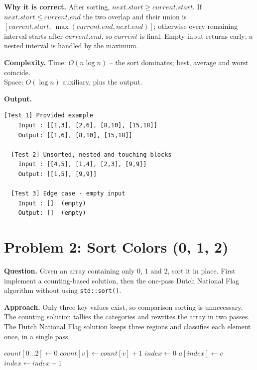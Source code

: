 \documentclass[11pt]{article}
\begin{document}
\textbf{Why it is correct.} After sorting, $next.start \ge current.start$. If $next.start \le current.end$ the two overlap and their union is $[current.start,\ \max(current.end, next.end)]$; otherwise every remaining interval starts after $current.end$, so $current$ is final. Empty input returns early; a nested interval is handled by the maximum.

\textbf{Complexity.} Time: $O(n\log n)$ -- the sort dominates; best, average and worst coincide.\\
Space: $O(\log n)$ auxiliary, plus the output.

\textbf{Output.}

\begin{lstlisting}[style=term]
  [Test 1] Provided example
    Input : [[1,3], [2,6], [8,10], [15,18]]
    Output: [[1,6], [8,10], [15,18]]

  [Test 2] Unsorted, nested and touching blocks
    Input : [[4,5], [1,4], [2,3], [9,9]]
    Output: [[1,5], [9,9]]

  [Test 3] Edge case - empty input
    Input : []  (empty)
    Output: []  (empty)
\end{lstlisting}

\newpage

\section*{Problem 2: Sort Colors (0, 1, 2)}
\textbf{Question.} Given an array containing only $0$, $1$ and $2$, sort it in place. First implement a counting-based solution, then the one-pass Dutch National Flag algorithm without using \texttt{std::sort()}.

\textbf{Approach.} Only three key values exist, so comparison sorting is unnecessary. The counting solution tallies the categories and rewrites the array in two passes. The Dutch National Flag solution keeps three regions and classifies each element once, in a single pass.

\begin{algorithm}[H]
\caption{Sort Colors -- Counting Based}
\begin{algorithmic}[1]
    \State $count[0 \ldots 2] \gets 0$
        \State $count[v] \gets count[v] + 1$
    \EndFor
    \State $index \gets 0$
            \State $a[index] \gets c$
            \State $index \gets index + 1$
        \EndFor
    \EndFor
\EndFunction
\end{algorithmic}
\end{algorithm}
\end{document}
